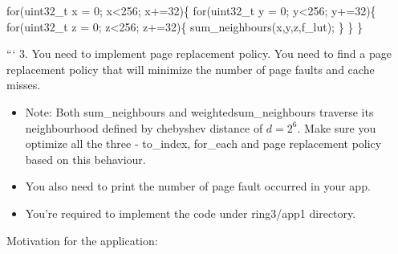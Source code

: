 \documentclass[]{article}
\providecommand{\tightlist}{%
  \setlength{\itemsep}{0pt}\setlength{\parskip}{0pt}}
\begin{document}
for(uint32\_t x = 0; x\textless{}256; x+=32)\{ for(uint32\_t y = 0;
y\textless{}256; y+=32)\{ for(uint32\_t z = 0; z\textless{}256; z+=32)\{
sum\_neighbours(x,y,z,f\_lut); \} \} \}

``` 3. You need to implement page replacement policy. You need to find a
page replacement policy that will minimize the number of page faults and
cache misses.

\begin{itemize}
\tightlist
\item
  Note: Both sum\_neighbours and weightedsum\_neighbours traverse its
  neighbourhood defined by chebyshev distance of \(d=2^6\). Make sure
  you optimize all the three - to\_index, for\_each and page replacement
  policy based on this behaviour.
\item
  You also need to print the number of page fault occurred in your app.
\item
  You're required to implement the code under ring3/app1 directory.
\end{itemize}

Motivation for the application:
\end{document}
